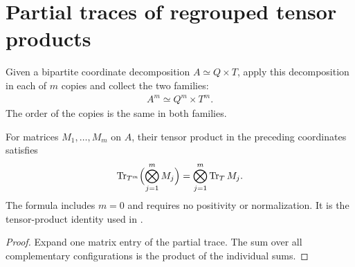 \section{Partial traces of regrouped tensor products}
\label{sec:tensor_power_partial_trace}

\begin{definition}
\label{def:copies_product_equiv}
Given a bipartite coordinate decomposition $A\simeq Q\times T$, apply
this decomposition in each of $m$ copies and collect the two families:
\begin{align*}
 A^m\simeq Q^m\times T^m.
\end{align*}
The order of the copies is the same in both families.
\end{definition}

\begin{theorem}
\label{thm:partial_trace_tensor_power_reindex}
For matrices $M_1,\ldots,M_m$ on $A$, their tensor product in the
preceding coordinates satisfies
\begin{align*}
 \operatorname{Tr}_{T^m}\Bigl(\bigotimes_{j=1}^m M_j\Bigr)
 =\bigotimes_{j=1}^m\operatorname{Tr}_T M_j.
\end{align*}
The formula includes $m=0$ and requires no positivity or normalization.
It is the tensor-product identity used in
\cite[Section~7, lines~550--560]{OpenAI2026AreaLaw}.
\end{theorem}
\begin{proof}
Expand one matrix entry of the partial trace. The sum over all
complementary configurations is the product of the individual sums.
\end{proof}
